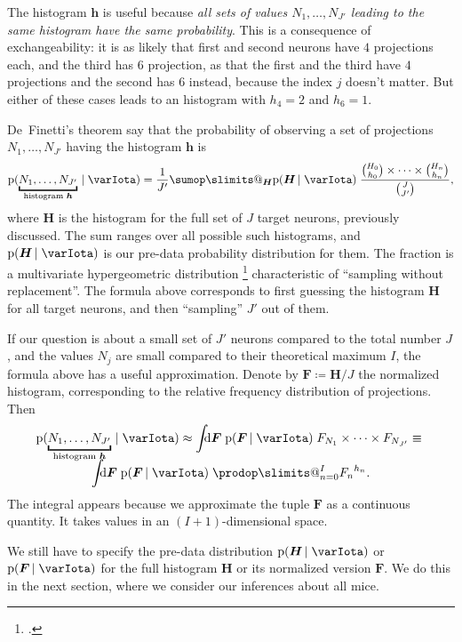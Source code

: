 \documentclass[\ifafour a4paper,12pt,\else a5paper,10pt,\fi%
onecolumn,oneside,article,%
british%
]{memoir}
\makeatletter
\theoremstyle{remark}
\theoremstyle{innote}
\def\sum{\DOTSI\sumop\slimits@}
\def\prod{\DOTSI\prodop\slimits@}
\newcommand*{\citep}{\footcites}
\newcommand*{\di}{\mathrm{d}}%
\newcommand*{\defd}{\coloneqq}
\newcommand*{\pf}{\mathrm{p}}%
\renewcommand*{\|}[1][]{\nonscript\,#1\vert\nonscript\;\mathopen{}}
\newcommand*{\chap}{ch.}%
\newcommand*{\yI}{\varIota}
\newcommand*{\yF}{\bm{F}}
\newcommand*{\yh}{\bm{h}}
\newcommand*{\yH}{\bm{H}}
\makeatother
\begin{document}
The histogram $\yh$ is useful because \emph{all sets of values
  $N_{1},\dotsc,N_{J'}$ leading to the same histogram have the same
  probability}. This is a consequence of exchangeability: it is as likely
that first and second neurons have $4$ projections each, and the third has
$6$ projection, as that the first and the third have $4$ projections and
the second has $6$ instead, because the index $j$ doesn't matter. But
either of these cases leads to an histogram with $h_{4}=2$ and $h_{6}=1$.

De~Finetti's theorem say that the probability of observing a set of
projections $N_{1},\dotsc,N_{J'}$ having the histogram $\yh$ is
\begin{equation}
  \label{eq:definetti_Nj_finite}
  \pf(\underbracket{N_{1},\dotsc,N_{J'}}_{\text{histogram $\yh$}} \| \yI) =
\frac{1}{J'}  \sum_{\yH} \pf(\yH \| \yI)\;
  \frac{\binom{H_{0}}{h_{0}}\times\dotsm\times\binom{H_{n}}{h_{n}}}{\binom{J}{J'}},
\end{equation}
where $\yH$ is the histogram for the full set of $J$ target neurons,
previously discussed. The sum ranges over all possible such histograms, and
$\pf(\yH \| \yI)$ is our pre-data probability distribution for them. The
fraction is a multivariate hypergeometric distribution
\citep[\chap~39]{johnsonetal1969_r1996} characteristic of \enquote{sampling
  without replacement}. The formula above corresponds to first guessing the
histogram $\yH$ for all target neurons, and then \enquote{sampling} $J'$
out of them.

If our question is about a small set of $J'$ neurons compared to the total
number $J$, and the values $N_{j}$ are small compared to their theoretical
maximum $I$, the formula above has a useful approximation. Denote by
$\yF \defd \yH/J$ the normalized histogram, corresponding to the relative
frequency distribution of projections. Then
\begin{multline}
  \label{eq:definetti_Nj_infinite_approx}
  \pf(\underbracket{N_{1},\dotsc,N_{J'}}_{\text{histogram $\yh$}} \| \yI) \approx
\int\!\!\!\di\yF\;
\pf(\yF \| \yI)\; F_{N_{1}} \times \dotsm \times F_{N_{J'}}
\equiv{}\\[-2\jot]
\int\!\!\!\di\yF\;
\pf(\yF \| \yI)\; \prod_{n=0}^{I}{F_{n}}^{h_{n}}.
\end{multline}
The integral appears because we approximate the tuple $\yF$ as a continuous
quantity. It takes values in an $(I+1)$-dimensional space.


We still have to specify the pre-data distribution $\pf(\yH \| \yI)$ or
$\pf(\yF \| \yI)$ for the full histogram $\yH$ or its normalized version
$\yF$. We do this in the next section, where we consider our inferences
about all mice.
\end{document}
